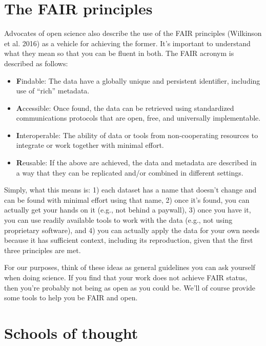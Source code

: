 \documentclass[
  letterpaper,
  DIV=11,
  numbers=noendperiod]{scrreprt}
\providecommand{\tightlist}{%
  \setlength{\itemsep}{0pt}\setlength{\parskip}{0pt}}\usepackage{longtable,booktabs,array}
\begin{document}
\hypertarget{fair}{%
\section{The FAIR principles}\label{fair}}

Advocates of open science also describe the use of the FAIR principles
(Wilkinson et al. 2016) as a vehicle for achieving the former. It's
important to understand what they mean so that you can be fluent in
both. The FAIR acronym is described as follows:

\begin{itemize}
\tightlist
\item
  \textbf{F}indable: The data have a globally unique and persistent
  identifier, including use of ``rich'' metadata.
\item
  \textbf{A}ccessible: Once found, the data can be retrieved using
  standardized communications protocols that are open, free, and
  universally implementable.
\item
  \textbf{I}nteroperable: The ability of data or tools from
  non-cooperating resources to integrate or work together with minimal
  effort.
\item
  \textbf{R}eusable: If the above are achieved, the data and metadata
  are described in a way that they can be replicated and/or combined in
  different settings.
\end{itemize}

Simply, what this means is: 1) each dataset has a name that doesn't
change and can be found with minimal effort using that name, 2) once
it's found, you can actually get your hands on it (e.g., not behind a
paywall), 3) once you have it, you can use readily available tools to
work with the data (e.g., not using proprietary software), and 4) you
can actually apply the data for your own needs because it has sufficient
context, including its reproduction, given that the first three
principles are met.

For our purposes, think of these ideas as general guidelines you can ask
yourself when doing science. If you find that your work does not achieve
FAIR status, then you're probably not being as open as you could be.
We'll of course provide some tools to help you be FAIR and open.

\hypertarget{schools}{%
\section{Schools of thought}\label{schools}}
\end{document}
